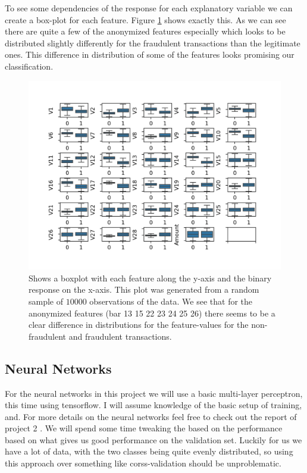 \documentclass{article}
\begin{document}
To see some dependencies of the response for each explanatory variable we can
create a box-plot for each feature. Figure \ref{databoxplot} shows exactly
this. As we can see there are quite a few of the anonymized features especially
which looks to be distributed slightly differently for the fraudulent
transactions than the legitimate ones. This difference in distribution of some
of the features looks promising our classification.


\begin{figure}
	\centering
	\includegraphics[scale=0.8]{data_features_boxplot}
	\caption{Shows a boxplot with each feature along the y-axis and the
		binary response on the x-axis. This plot was generated from a random
		sample of $10 000$ observations of the data. We see that for the anonymized
		features (bar 13 15 22 23 24 25 26) there seems to be a clear difference in
		distributions for the feature-values for the non-fraudulent and fraudulent
		transactions.}
	\label{databoxplot}
\end{figure}

\subsection{Neural Networks}
For the neural networks in this project we will use a basic multi-layer
perceptron, this time using tensorflow. I will assume knowledge of the basic
setup of training, and. For more details on the neural networks feel free to
check out the report of project 2 \cite{githubrepoproject2}. We will spend some
time tweaking the based on the performance based on what gives us good
performance on the validation set. Luckily for us we have a lot of data, with
the two classes being quite evenly distributed, so using this approach over
something like corss-validation should be unproblematic.
\end{document}
